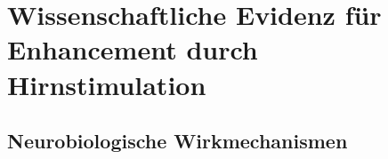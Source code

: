 \chapter{Wissenschaftliche Evidenz für Enhancement durch Hirnstimulation}
\label{chap:evidenz}


\section{Neurobiologische Wirkmechanismen}
\label{sec:wirkmechanismen}




